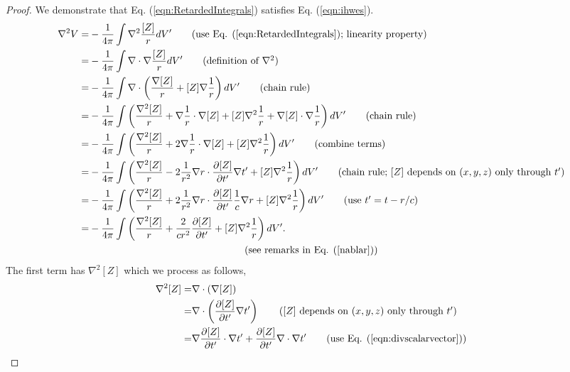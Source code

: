 \documentclass[11pt]{article}              %
\begin{document}
\begin{proof}
We demonstrate that Eq. (\ref{eqn:RetardedIntegrals}) satisfies Eq. (\ref{eqn:ihwes}).
\begin{align}
    \nabla^2 V=&-\frac{1}{4\pi}\int\nabla^2\frac{[Z]}{r}dV^\prime\tag{use Eq. (\ref{eqn:RetardedIntegrals}); linearity property}\\
    =&-\frac{1}{4\pi}\int\nabla\cdot\nabla\frac{[Z]}{r}dV^\prime\tag{definition of $\nabla^2$}\\
    =&-\frac{1}{4\pi}\int \nabla\cdot\left(\frac{\nabla{[Z]}}{r}+{[Z]}\nabla\frac{1}{r}\right)dV^\prime\tag{chain rule}\\
    =&-\frac{1}{4\pi}\int \left(\frac{\nabla^2 [Z]}{r}+\nabla\frac{1}{r}\cdot \nabla [Z]+[Z]\nabla^2 \frac{1}{r}+\nabla [Z]\cdot \nabla \frac{1}{r}\right)dV^\prime\tag{chain rule}\\
    =&-\frac{1}{4\pi}\int \left(\frac{\nabla^2 [Z]}{r}+2\nabla\frac{1}{r}\cdot \nabla [Z]+[Z]\nabla^2 \frac{1}{r}\right)dV^\prime\tag{combine terms}\\
    =&-\frac{1}{4\pi}\int \left(\frac{\nabla^2 [Z]}{r}-2\frac{1}{r^2}\nabla r\cdot\frac{\partial [Z]}{\partial t^\prime}\nabla t^\prime+[Z]\nabla^2 \frac{1}{r}\right)dV^\prime\tag{chain rule; $[Z]$ depends on $(x,y,z)$ only through $t^\prime$}\\
    =&-\frac{1}{4\pi}\int \left(\frac{\nabla^2 [Z]}{r}+2\frac{1}{r^2}\nabla r\cdot\frac{\partial [Z]}{\partial t^\prime}\frac{1}{c}\nabla r+[Z]\nabla^2 \frac{1}{r}\right)dV^\prime\tag{use $t^\prime=t-r/c$}\\
    =&-\frac{1}{4\pi}\int \left(\frac{\nabla^2 [Z]}{r}+\frac{2}{cr^2}\frac{\partial [Z]}{\partial t^\prime}+[Z]\nabla^2 \frac{1}{r}\right)dV^\prime. \notag\\
    &\ \ \ \ \ \ \ \ \ \ \ \ \ \ \ \ \ \ \ \ \ \ \ \ \ \ \ \ \ \ \ \ \ \ \ \ \ \ \ \ \ \ \ \ \ \ \ \mbox{(see remarks in Eq. (\ref{nablar}))}\label{eqnlaplacian}
\end{align}
The first term has $\nabla^2[Z]$ which we process as follows,
\begin{align}
    \nabla^2 [Z]=&\nabla\cdot(\nabla [Z])\notag\\
    =&\nabla\cdot\left(\frac{\partial [Z]}{\partial t^\prime}\nabla t^\prime\right)\tag{$[Z]$ depends on $(x,y,z)$ only through $t^\prime$}\\
    =&\nabla\frac{\partial [Z]}{\partial t^\prime}\cdot\nabla t^\prime+\frac{\partial [Z]}{\partial t^\prime}\nabla\cdot\nabla t^\prime\tag{use Eq. (\ref{eqn:divscalarvector})}\\

\end{align}
\end{proof}
\end{document}
